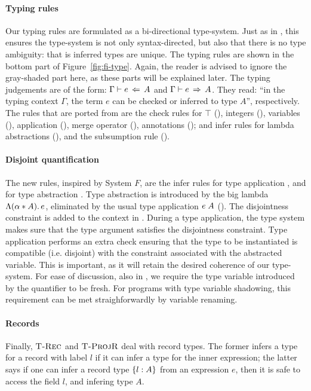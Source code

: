 \paragraph{Typing rules}
Our typing rules are formulated as a bi-directional type-system. 
Just as in \oldname, this ensures the type-system is not only syntax-directed, but
also that there is no type ambiguity: that is inferred types are unique.
The typing rules are shown in the bottom part of Figure~\ref{fig:fi-type}. 
Again, the reader is advised to ignore the
gray-shaded part here, as these parts will be explained later. 
The typing judgements are of the form: $\Gamma \vdash e \ \!\Leftarrow\! \ A$ and  
$\Gamma \vdash e \ \!\Rightarrow\! \ A$.
They read: ``in the typing context $\Gamma$, the term $e$ can be
checked or inferred to
type $A$'', respectively. 
The rules that are ported from \oldname are the
check rules for $\top$ (), integers (), 
variables (),  application (), merge operator  
(), annotations (); and infer rules
for lambda abstractions (), and the subsumption rule 
().

\paragraph{Disjoint quantification}
The new rules, inspired by System $F$, are the infer rules for type
application , and for type abstraction
.  Type abstraction is introduced by the big
lambda $\Lambda (\alpha * A).\, e$, eliminated by the usual type application
$e \; A$ ().  The disjointness constraint is
added to the context in . During a type application, the
type system makes sure that the type argument satisfies the
disjointness constraint.  Type application performs an extra check
ensuring that the type to be instantiated is compatible
(i.e. disjoint) with the constraint associated with the abstracted
variable.  This is important, as it will retain the desired coherence
of our type-system.  For ease of discussion, also in
, we require the type variable introduced by the
quantifier to be fresh.  For programs with type variable shadowing,
this requirement can be met straighforwardly by variable renaming.

\paragraph{Records}
Finally, $\textsc{T-Rec}$ and $\textsc{T-ProjR}$ deal with record types.
The former infers a type for a record with label $l$ if it can infer a type for the
inner expression; the latter says if one can infer a record type $\{ l : A \}$ 
from an expression $e$, then it is safe to access the field $l$, and infering type $A$.

